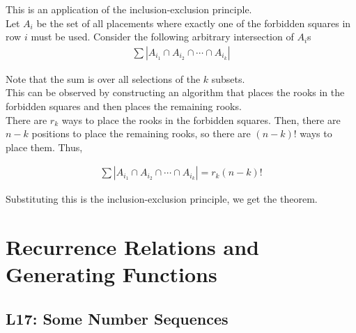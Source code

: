 \documentclass{report}
\begin{document}
\begin{subproof}
    This is an application of the inclusion-exclusion principle. \\

    Let $A_i$ be the set of all placements where exactly one of the
    forbidden squares in row $i$ must be used. Consider the following
    arbitrary intersection of $A_i$s \\

    \begin{align*}
        \sum |A_{i_1} \cap A_{i_2} \cap \cdots \cap A_{i_k}|
    \end{align*}

    Note that the sum is over all selections of the $k$ subsets. \\

    This can be observed by constructing an algorithm that places the rooks
    in the forbidden squares and then places the remaining rooks. \\

    There are $r_k$ ways to place the rooks in the forbidden squares. Then,
    there are $n - k$ positions to place the remaining rooks, so there are
    $(n-k)!$ ways to place them. Thus,

    \begin{align*}
        \sum |A_{i_1} \cap A_{i_2} \cap \cdots \cap A_{i_k}| = r_k(n-k)!
    \end{align*}

    Substituting this is the inclusion-exclusion principle, we get
    the theorem.

\end{subproof}

\chapter{Recurrence Relations and Generating Functions}
\section{L17: Some Number Sequences}

\end{document}
